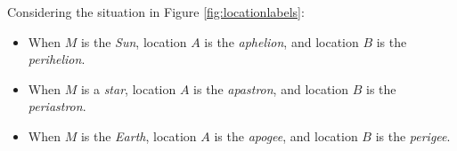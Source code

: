 \documentclass[12pt]{article}
\begin{document}
Considering the situation in Figure \ref{fig:locationlabels}:

\begin{itemize}
	\item When $M$ is the \emph{Sun}, location $A$ is the \emph{aphelion}, and location $B$ is the \emph{perihelion}.
	\item When $M$ is a \emph{star}, location $A$ is the \emph{apastron}, and location $B$ is the \emph{periastron}.
	\item When $M$ is the \emph{Earth}, location $A$ is the \emph{apogee}, and location $B$ is the \emph{perigee}.
\end{itemize}
\end{document}
